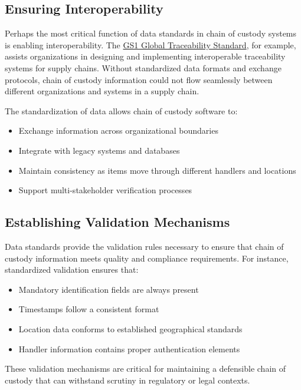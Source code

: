 \documentclass[title=small,preset=opensansnote,par=skip]{article}
\begin{document}
\subsection{Ensuring Interoperability}
\label{sec:org843a4e3}

Perhaps the most critical function of data standards in chain of custody systems is enabling interoperability. The \href{https://www.gs1.org/standards/gs1-global-traceability-standard/current-standard}{GS1 Global Traceability Standard}, for example, assists organizations in designing and implementing interoperable traceability systems for supply chains. Without standardized data formats and exchange protocols, chain of custody information could not flow seamlessly between different organizations and systems in a supply chain.

The standardization of data allows chain of custody software to:

\begin{itemize}
\item Exchange information across organizational boundaries
\item Integrate with legacy systems and databases
\item Maintain consistency as items move through different handlers and locations
\item Support multi-stakeholder verification processes
\end{itemize}
\subsection{Establishing Validation Mechanisms}
\label{sec:org160ff8a}

Data standards provide the validation rules necessary to ensure that chain of custody information meets quality and compliance requirements. For instance, standardized validation ensures that:

\begin{itemize}
\item Mandatory identification fields are always present
\item Timestamps follow a consistent format
\item Location data conforms to established geographical standards
\item Handler information contains proper authentication elements
\end{itemize}

These validation mechanisms are critical for maintaining a defensible chain of custody that can withstand scrutiny in regulatory or legal contexts.
\end{document}
